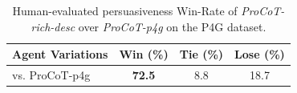 \begin{table}[t]
    \footnotesize
    \centering
    \begin{tabular}{lccc}
        \toprule
        \textbf{Agent Variations} & \textbf{Win (\%)} & \textbf{Tie (\%)} & \textbf{Lose (\%)} \\
        \midrule
        vs. ProCoT-p4g & \textbf{72.5} & 8.8 & 18.7 \\
        \bottomrule
    \end{tabular}
    \caption{Human-evaluated persuasiveness Win-Rate of \textit{ProCoT-rich-desc} over \textit{ProCoT-p4g} on the P4G dataset.}
    \label{tab:result-p4g-humaneval-persuasiveness}
\end{table}